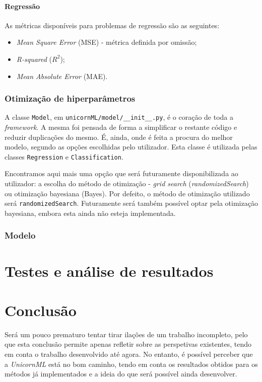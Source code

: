 \documentclass[a4paper]{report}
\begin{document}
{            \subsubsection{Regressão} \label{sssec:Regression2}
			As métricas disponíveis para problemas de regressão são as seguintes:
			\begin{itemize}
				\item \textit{Mean Square Error} (MSE) - métrica definida por omissão;
				\item \textit{R-squared} ($R^{2}$);
				\item \textit{Mean Absolute Error} (MAE).
			\end{itemize}

		\subsection{Otimização de hiperparâmetros} \label{subsec:Optimization}
		A classe \texttt{Model}, em \texttt{unicornML/model/\_\_init\_\_.py}, é o coração de toda a \textit{framework}.
		A mesma foi pensada de forma a simplificar o restante código e reduzir duplicações do mesmo. 
		É, ainda, onde é feita a procura do melhor modelo, segundo as opções escolhidas pelo utilizador.
		Esta classe é utilizada pelas classes \texttt{Regression} e \texttt{Classification}.
		
		Encontramos aqui mais uma opção que será futuramente disponibilizada ao utilizador: a escolha do método de otimização - \textit{grid search} (\textit{randomizedSearch}) ou otimização bayesiana (Bayes).
		Por defeito, o método de otimização utilizado será \texttt{randomizedSearch}. Futuramente será também possível optar pela otimização bayesiana, embora esta ainda não esteja implementada.

		\subsection{Modelo} \label{subsec:Model}
}

\chapter{Testes e análise de resultados} \label{ch:Test&Analysis}
\large{
	
}

\chapter{Conclusão} \label{ch:Conclusion}
\large{
	Será um pouco prematuro tentar tirar ilações de um trabalho incompleto, pelo que esta conclusão permite apenas refletir sobre as perspetivas existentes, tendo em conta o trabalho desenvolvido até agora.
	No entanto, é possível perceber que a \textsl{UnicornML} está no bom caminho, tendo em conta os resultados obtidos para os métodos já implementados e a ideia do que será possível ainda desenvolver.
}
\end{document}
